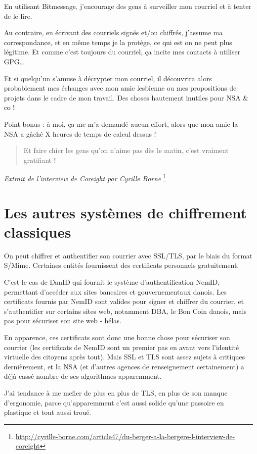 En utilisant Bitmessage, j'encourage des gens à surveiller mon courriel
et à tenter de le lire.

Au contraire, en écrivant des courriels signés et/ou chiffrés, j'assume
ma correspondance, et en même temps je la protège, ce qui est on ne peut
plus légitime. Et comme c'est toujours du courriel, ça incite mes
contacts à utiliser GPG\ldots{}

Et si quelqu'un s'amuse à décrypter mon courriel, il découvrira alors
probablement mes échanges avec mon amie lesbienne ou mes propositions de
projets dans le cadre de mon travail. Des choses hautement inutiles pour
NSA \& co !

Point bonus : à moi, ça me m'a demandé aucun effort, alors que mon amie la NSA a gâché X heures de temps de calcul dessus !

\begin{quote}
Et faire chier les gens qu'on n'aime pas dès le matin, c'est vraiment gratifiant !
\end{quote}

\emph{Extrait de l'interview de Coreight par Cyrille Borne}
\footnote{\url{http://cyrille-borne.com/article47/du-berger-a-la-bergere-l-interview-de-coreight}}

\section{Les autres systèmes de chiffrement classiques}\label{les-autres-systuxe8mes-de-chiffrement-classiques}

On peut chiffrer et authentifier son courrier avec SSL/TLS, par le biais
du format S/Mime. Certaines entités fournissent des certificats personnels gratuitement.

C'est le cas de DanID qui fournit le système d'authentification NemID, permettant d'accéder aux sites bancaires et gouvernementaux danois. Les
certificats fournis par NemID sont valides pour signer et chiffrer du courrier, et s'authentifier sur certains sites web, notamment
DBA, le Bon Coin danois, mais pas pour sécuriser son site web - hélas.

En apparence, ces certificats sont donc une bonne chose pour sécuriser son courrier (les certificats de NemID sont un premier pas en avant vers
l'identité virtuelle des citoyens après tout). Mais SSL et TLS sont assez sujets à critiques dernièrement, et la NSA (et d'autres agences de
renseignement certainement) a déjà cassé nombre de ses algorithmes apparemment.

J'ai tendance à me mefier de plus en plus de TLS, en plus de son manque
d'ergonomie, parce qu'apparemment c'est aussi solide qu'une passoire en
plastique et tout aussi troué.

